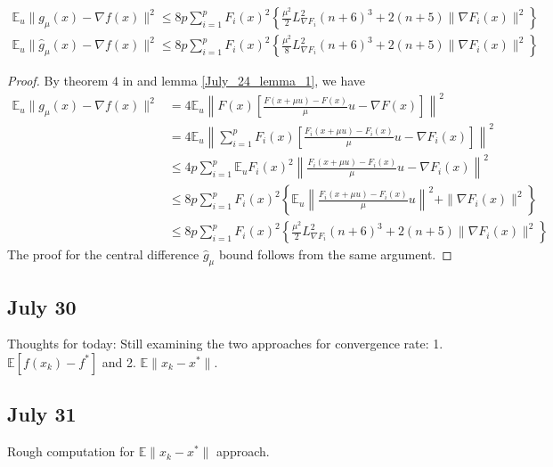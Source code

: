 \documentclass{article}
\begin{document}
\begin{theorem}
\begin{align}
\mathbb{E}_u\|g_{\mu}(x) - \nabla f(x)\|^2 \leq 8p\sum_{i=1}^pF_i(x)^2\left\{\frac{\mu^2}{2}L_{\nabla F_i}^2(n+6)^3 + 2(n+5)\|\nabla F_i(x)\|^2\right\}
\end{align}
\begin{align}
\mathbb{E}_u\|\hat{g}_{\mu}(x) - \nabla f(x)\|^2 \leq 8p\sum_{i=1}^pF_i(x)^2\left\{\frac{\mu^2}{8}L_{\nabla F_i}^2(n+6)^3 + 2(n+5)\|\nabla F_i(x)\|^2\right\}
\end{align}
\begin{proof}
By theorem $4$ in \cite{Nesterov2015} and lemma \ref{July_24_lemma_1}, we have 
\begin{align*}
\mathbb{E}_u\|g_{\mu}(x)-\nabla f(x)\|^2 & = 4\mathbb{E}_u\left\|F(x)\left[\frac{F(x+\mu u) - F(x)}{\mu}u-\nabla F(x)\right]\right\|^2 \\ & =   4\mathbb{E}_u\left\| \sum_{i=1}^pF_i(x)\left[ \frac{F_i(x+\mu u) - F_i(x)}{\mu}u-\nabla F_i(x)\right] \right\|^2 \\ & \leq 4p\sum_{i=1}^p\mathbb{E}_uF_i(x)^2\left\| \frac{F_i(x+\mu u) - F_i(x)}{\mu}u - \nabla F_i(x) \right\|^2 \\ & \leq 8p\sum_{i=1}^pF_i(x)^2\left\{\mathbb{E}_u\left\| \frac{F_i(x+\mu u) - F_i(x)}{\mu}u \right\|^2 + \|\nabla F_i(x)\|^2 \right\} \\ & \leq 8p\sum_{i=1}^pF_i(x)^2\left\{ \frac{\mu^2}{2}L_{\nabla F_i}^2(n+6)^3 + 2(n+5)\|\nabla F_i(x)\|^2 \right\}
\end{align*}
The proof for the central difference $\hat{g}_{\mu}$ bound follows from the same argument. 
\end{proof}
\end{theorem}

\subsection{July 30}

Thoughts for today: Still examining the two approaches for convergence rate: 1. $\mathbb{E}[f(x_k) - f^*]$ and 2. $\mathbb{E}\|x_k-x^*\|$.

\subsection{July 31}

Rough computation for $\mathbb{E}\|x_k-x^*\|$ approach. \newline 
\end{document}

